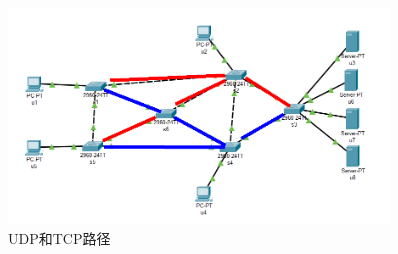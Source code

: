 \begin{figure}[h]
	\centering
	\includegraphics[width=0.9\textwidth]{image/topo_tcp_udp.png}
	\caption{UDP和TCP路径}
 	\label{fig:topo3}
\end{figure}
